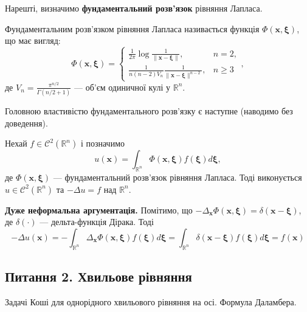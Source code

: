 \documentclass{exam_template}
\begin{document}
Нарешті, визначимо \textbf{фундаментальний розв'язок} рівняння Лапласа.
\begin{definition}
    Фундаментальним розв'язком рівняння Лапласа називається функція
    $\Phi(\mathbf{x},\boldsymbol{\xi})$, що має вигляд:
    \begin{equation*}
        \Phi(\mathbf{x},\boldsymbol{\xi}) = \begin{cases}
            \frac{1}{2\pi}\log \frac{1}{\|\mathbf{x}-\boldsymbol{\xi}\|}, & n=2, \\
            \frac{1}{n(n-2)V_n}\frac{1}{\|\mathbf{x-\boldsymbol{\xi}}\|^{n-2}}, & n \geq 3
        \end{cases},
    \end{equation*}
    де $V_n = \frac{\pi^{n/2}}{\Gamma(n/2+1)}$ --- об'єм одиничної кулі у
    $\mathbb{R}^n$.
\end{definition}

Головною властивістю фундаментального розв'язку є наступне (наводимо без
доведення).
\begin{theorem}
    Нехай $f \in \mathcal{C}^2(\mathbb{R}^n)$ і позначимо
    \begin{equation*}
        u(\mathbf{x}) = \int_{\mathbb{R}^n}\Phi(\mathbf{x},\boldsymbol{\xi})f(\boldsymbol{\xi})d\boldsymbol{\xi},
    \end{equation*}
    де $\Phi(\mathbf{x},\boldsymbol{\xi})$ --- фундаментальний розв'язок
    рівняння Лапласа. Тоді виконується $u \in \mathcal{C}^2(\mathbb{R}^n)$ та
    $-\Delta u = f$ над $\mathbb{R}^n$.
\end{theorem}

\textbf{Дуже неформальна аргументація.} Помітимо, що
$-\Delta_{\mathbf{x}}\Phi(\mathbf{x},\boldsymbol{\xi})=\delta(\mathbf{x}-\boldsymbol{\xi})$, де 
$\delta(\cdot)$ --- дельта-функція Дірака. Тоді
\begin{equation*}
    -\Delta u(\mathbf{x}) = -\int_{\mathbb{R}^n}\Delta_{\mathbf{x}}\Phi(\mathbf{x},\boldsymbol{\xi})f(\boldsymbol{\xi})d\boldsymbol{\xi} = \int_{\mathbb{R}^n}\delta(\mathbf{x}-\boldsymbol{\xi})f(\boldsymbol{\xi})d\boldsymbol{\xi} = f(\mathbf{x})
\end{equation*}

\newpage

\subsection{Питання 2. Хвильове рівняння}

\begin{problem}
    Задачі Коші для однорідного хвильового рівняння на осі. Формула Даламбера.
\end{problem}
\end{document}
